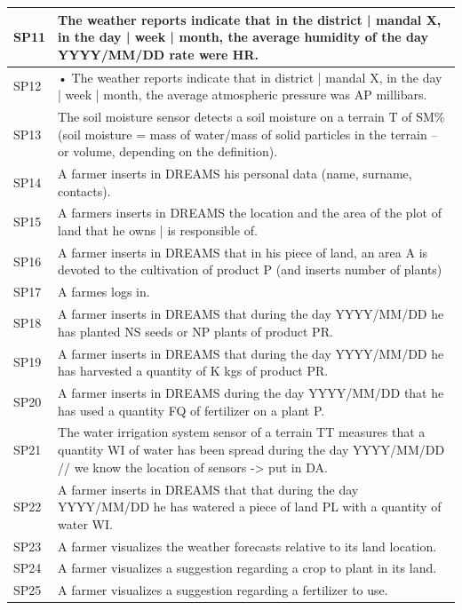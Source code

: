 \documentclass{article}
\begin{document}
\begin{longtable}[c]{|m{0.75cm}|m{11cm}|}
 \hline
 SP11 & The weather reports indicate that in the district | mandal X, in  the day | week | month, the average humidity  of the day YYYY/MM/DD  rate were HR.\\
 \hline
 SP12 & •	The weather reports indicate that in district | mandal X, in the day | week | month, the average atmospheric pressure was AP millibars.\\
 \hline
 SP13 & The soil moisture sensor detects a soil moisture on a terrain T of SM\% (soil moisture = mass of water/mass of solid particles in the terrain – or volume, depending on the definition).\\
 \hline
 SP14 & A farmer inserts in DREAMS his personal data (name, surname, contacts).\\
 \hline
 SP15 & A farmers inserts in DREAMS the location and the area of the plot of land that he owns | is responsible of.\\
 \hline
 SP16 & A farmer inserts in DREAMS that in his piece of land, an area A is devoted to the cultivation of product P (and inserts number of plants)  %
 \\
 \hline
 SP17 & A farmes logs in.\\
 \hline
 SP18 & A farmer inserts in DREAMS that during the day YYYY/MM/DD  he has planted NS seeds or NP plants of product PR.\\
 \hline
 SP19 & A farmer inserts in DREAMS that during the day YYYY/MM/DD he has harvested a quantity of K kgs of product PR.\\
 \hline
 SP20 & A farmer inserts in DREAMS during the day YYYY/MM/DD  that he has used a quantity FQ of fertilizer on a plant P.\\
 \hline
 SP21 & The water irrigation system  sensor of a terrain TT measures that a quantity WI of water  has been spread during the day YYYY/MM/DD // we know the location of sensors -> put in DA.\\
 \hline
 SP22 & A farmer inserts in DREAMS that that during the day YYYY/MM/DD he has watered a piece of land PL with a quantity of water WI.\\
 \hline
 SP23 & A farmer visualizes the weather forecasts relative to its land location.\\
 \hline
 SP24 & A farmer visualizes a suggestion regarding a crop to plant in its land.\\
 \hline
 SP25 & A farmer visualizes a suggestion regarding a fertilizer to use.\\

\end{longtable}
\end{document}
